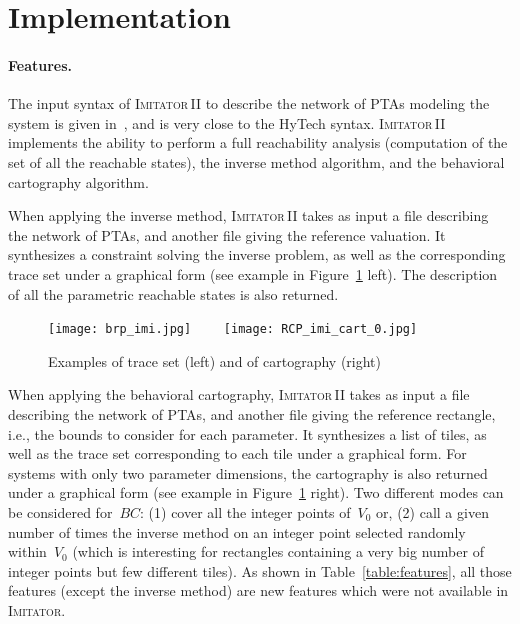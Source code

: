 \documentclass[submission,copyright,creativecommons]{eptcs}
\newcommand{\BC}{\mathit{BC}}
\newcommand{\hytech}{{\sc HyTech}}
\newcommand{\imitator}{\textsc{Imitator}}
\newcommand{\imitatordeux}{\textsc{Imitator}\,II}
\newcommand{\paragraphe}[1]{\paragraph{#1.}}
\begin{document}
\section{Implementation} \label{sec:implementation}


\paragraphe{Features}


The input syntax of \imitatordeux{} to describe the network of PTAs modeling the system is given in~\cite{imitator2_web}, and is very close to the \hytech{} syntax.
\imitatordeux{} implements the ability to perform a full reachability analysis (computation of the set of all the reachable states), the inverse method algorithm, and the behavioral cartography algorithm.

When applying the inverse method, \imitatordeux{} takes as input a file describing the network of PTAs, and another file giving the reference valuation.
It synthesizes a constraint solving the inverse problem, as well as the corresponding trace set under a graphical form (see example in Figure~\ref{fig:graphical_outputs} left).
The description of all the parametric reachable states is also returned.


\begin{figure}[ht!]
\centering
	\texttt{[image: brp\_imi.jpg]}
	\ \ \ \
	\texttt{[image: RCP\_imi\_cart\_0.jpg]}
\caption{Examples of trace set (left) and of cartography (right)}
\label{fig:graphical_outputs}
\end{figure}


When applying the behavioral cartography, \imitatordeux{} takes as input a file describing the network of PTAs, and another file giving the reference rectangle, i.e., the bounds to consider for each parameter.
It synthesizes a list of tiles, as well as the trace set corresponding to each tile under a graphical form.
For systems with only two parameter dimensions, the cartography is also returned under a graphical form (see example in Figure~\ref{fig:graphical_outputs} right).
Two different modes can be considered for~$\BC$: (1) cover all the integer points of~$V_0$ or, (2) call a given number of times the inverse method on an integer point selected randomly within~$V_0$ (which is interesting for rectangles containing a very big number of integer points but few different tiles).
As shown in Table~\ref{table:features}, all those features (except the inverse method) are new features which were not available in \imitator{}.

\label{ss:features}
\end{document}
